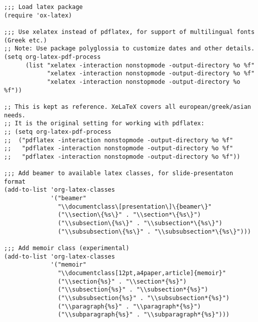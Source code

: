 \documentclass[nofonts]{tufte-handout}
\begin{document}
\begin{verbatim}
;;; Load latex package
(require 'ox-latex)

;;; Use xelatex instead of pdflatex, for support of multilingual fonts (Greek etc.)
;; Note: Use package polyglossia to customize dates and other details.
(setq org-latex-pdf-process
      (list "xelatex -interaction nonstopmode -output-directory %o %f"
            "xelatex -interaction nonstopmode -output-directory %o %f"
            "xelatex -interaction nonstopmode -output-directory %o %f"))

;; This is kept as reference. XeLaTeX covers all european/greek/asian needs.
;; It is the original setting for working with pdflatex:
;; (setq org-latex-pdf-process
;;  ("pdflatex -interaction nonstopmode -output-directory %o %f"
;;   "pdflatex -interaction nonstopmode -output-directory %o %f"
;;   "pdflatex -interaction nonstopmode -output-directory %o %f"))

;;; Add beamer to available latex classes, for slide-presentaton format
(add-to-list 'org-latex-classes
             '("beamer"
               "\\documentclass\[presentation\]\{beamer\}"
               ("\\section\{%s\}" . "\\section*\{%s\}")
               ("\\subsection\{%s\}" . "\\subsection*\{%s\}")
               ("\\subsubsection\{%s\}" . "\\subsubsection*\{%s\}")))

;;; Add memoir class (experimental)
(add-to-list 'org-latex-classes
             '("memoir"
               "\\documentclass[12pt,a4paper,article]{memoir}"
               ("\\section{%s}" . "\\section*{%s}")
               ("\\subsection{%s}" . "\\subsection*{%s}")
               ("\\subsubsection{%s}" . "\\subsubsection*{%s}")
               ("\\paragraph{%s}" . "\\paragraph*{%s}")
               ("\\subparagraph{%s}" . "\\subparagraph*{%s}")))


\end{verbatim}
\end{document}
